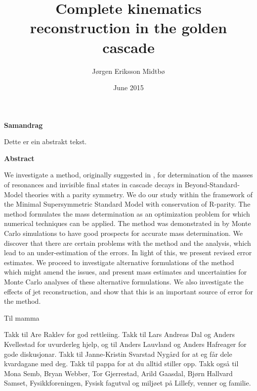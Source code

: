 \documentclass[twoside,english]{uiofysmaster}
\author{J\o rgen Eriksson Midtb\o}
\title{Complete kinematics reconstruction in the golden cascade}
\date{June 2015}
\newenvironment{abstractpage}
  {\cleardoublepage\vspace*{\fill}\thispagestyle{empty}}
  {\vfill\cleardoublepage}
\renewenvironment{abstract}[1]
  {\bigskip\selectlanguage{#1}%
   }
  {\par\bigskip}
\begin{document}

\cleardoublepage

\begin{abstractpage}

\begin{center}
	\textbf{Samandrag}
\end{center}
\begin{abstract}{norsk}
    Dette er ein abstrakt tekst.
\end{abstract}

\begin{center}
	\textbf{Abstract}
\end{center}
\begin{abstract}{english}
    We investigate a method, originally suggested in \cite{Webber:2009vm}, for determination of the masses of resonances and invisible final states in cascade decays in Beyond-Standard-Model theories with a parity symmetry. We do our study within the framework of the Minimal Supersymmetric Standard Model with conservation of R-parity. The method formulates the mass determination as an optimization problem for which numerical techniques can be applied. The method was demonstrated in \cite{Webber:2009vm} by Monte Carlo simulations to have good prospects for accurate mass determination. We discover that there are certain problems with the method and the analysis, which lead to an under-estimation of the errors. In light of this, we present revised error estimates. We proceed to investigate alternative formulations of the method which might amend the issues, and present mass estimates and uncertainties for Monte Carlo analyses of these alternative formulations. We also investigate the effects of jet reconstruction, and show that this is an important source of error for the method. 
\end{abstract}

\end{abstractpage}


\begin{dedication}
Til mamma
 \\\vspace{12pt}

\end{dedication}

\begin{acknowledgements}
Takk til Are Raklev for god rettleiing. Takk til Lars Andreas Dal og Anders Kvellestad for uvurderleg hjelp, og til Anders Lauvland og Anders Hafreager for gode diskusjonar. Takk til Janne-Kristin Svarstad Nyg{\aa}rd for at eg f{\aa}r dele kvardagane med deg. Takk til pappa for at du alltid stiller opp. Takk også til Mona Semb, Bryan Webber, Tor Gjerrestad, Arild Gaasdal, Bj{\o}rn Hallvard Samset, Fysikkforeningen, Fysisk fagutval og milj{\o}et p{\aa} Lillefy, venner og familie. 
\end{acknowledgements}
\end{document}
